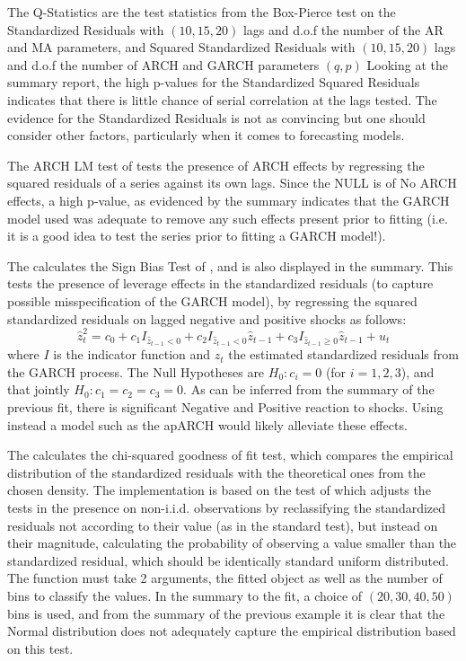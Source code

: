 The Q-Statistics are the test statistics from the Box-Pierce test on the
Standardized Residuals with $(10,15,20)$ lags and d.o.f the number of the
AR and MA parameters, and Squared Standardized Residuals with
$(10,15,20)$ lags and d.o.f the number of ARCH and GARCH parameters $(q,p)$
Looking at the summary report, the high p-values for the Standardized Squared
Residuals indicates that there is little chance of serial correlation at the
lags tested. The evidence for the Standardized Residuals is not as convincing
but one should consider other factors, particularly when it comes to forecasting
models.

The ARCH LM test of \citet{Engle1} tests the presence of ARCH effects by regressing
the squared residuals of a series against its own lags. Since the NULL is of No
ARCH effects, a high p-value, as evidenced by the summary indicates that the
GARCH model used was adequate to remove any such effects present prior to
fitting (i.e. it is a good idea to test the series prior to fitting a GARCH model!).

The \verb@signbias@ calculates the Sign Bias Test of \citet{EngleNg}, and is also
displayed in the summary. This tests the presence of leverage effects in the
standardized residuals (to capture possible misspecification of the GARCH model),
by regressing the squared standardized residuals on lagged negative and positive
shocks as follows:
\begin{equation}\label{signbias}
\hat z_t^2 = {c_0} + {c_1}{I_{{{\hat z}_{t - 1}} < 0}} + {c_2}{I_{{{\hat z}_{t - 1}} < 0}}{\hat z_{t - 1}} + {c_3}{I_{{{\hat z}_{t - 1}} \geqslant 0}}{\hat z_{t - 1}} + {u_t}
\end{equation}
where $I$ is the indicator function and $\hat z_t$ the estimated standardized residuals
from the GARCH process. The Null Hypotheses are $H_0:c_i=0$ (for $i=1,2,3$), and that
jointly $H_0:c_1=c_2=c_3=0$. As can be inferred from the summary of the previous
fit, there is significant Negative and Positive reaction to shocks. Using
instead a model such as the apARCH would likely alleviate these effects.

The \verb@gof@ calculates the chi-squared goodness of fit test, which compares
the empirical distribution of the standardized residuals with the theoretical
ones from the chosen density. The implementation is based on the test of
\citet{Palm1} which adjusts the tests in the presence on non-i.i.d. observations
by reclassifying the standardized residuals not according to their value (as in
the standard test), but instead on their magnitude, calculating the probability
of observing a value smaller than the standardized residual, which should be
identically standard uniform distributed. The function must take 2 arguments, the
fitted object as well as the number of bins to classify the values. In the
summary to the fit, a choice of $(20,30,40,50)$ bins is used, and from the
summary of the previous example it is clear that the Normal distribution does
not adequately capture the empirical distribution based on this test.

